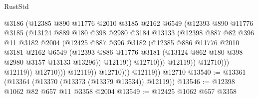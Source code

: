 \begin{lexlean}{RustStd}
\begin{coremodule}
                                    @3186
                                    (@12385
                                      @890
                                      @11776
                                      @2010
                                      @3185
                                      @2162
                                      @6549
                                      (@12393
                                        @890
                                        @11776
                                        @3185
                                        (@13124
                                          @889
                                          @180
                                          @398
                                          @2980
                                          @3184
                                          @13133
                                          (@12398
                                            @887
                                            @82
                                            @396
                                            @11
                                            @3182
                                            @2004
                                            (@12425
                                              @887
                                              @396
                                              @3182
                                              (@12385
                                                @886
                                                @11776
                                                @2010
                                                @3181
                                                @2162
                                                @6549
                                                (@12393
                                                  @886
                                                  @11776
                                                  @3181
                                                  (@13124 @862 @180 @398 @2980 @3157 @13133 @13296))
                                                @12119))
                                            @12710)))
                                      @12119))
                                  @12710)))
                            @12119))
                        @12710)))
                  @12119))
              @12710)))
        @12119))
    @12710
@13540 := @13361 (@13364 (@13370 (@13373 (@13379 @13534)) @12119))
@13546 := @12398 @1062 @82 @657 @11 @3358 @2004
@13549 := @12425 @1062 @657 @3358

\end{coremodule}
\end{lexlean}
